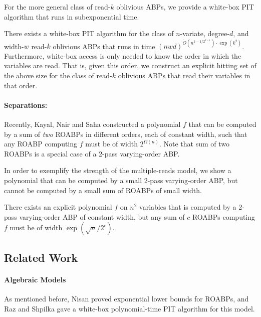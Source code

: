 \documentclass[11pt]{article}
\begin{document}
For the more general class of read-$k$ oblivious ABPs, we provide a white-box PIT algorithm that runs in subexponential time.

\begin{theorem}
\label{thm:intro:pit-k-abp}
There exists a white-box PIT algorithm for the class of $n$-variate, degree-$d$, and width-$w$ read-$k$ oblivious ABPs that runs in time $(nwd)^{\tilde{O}(n^{1-1/2^{k-1}})\cdot\exp(k^2)}$.
Furthermore, white-box access is only needed to know the order in which the variables are read. That is, given this order, we construct an explicit hitting set of the above size for the class of read-$k$ oblivious ABPs that read their variables in that order.
\end{theorem}


\paragraph{Separations:}
Recently, Kayal, Nair and Saha \cite{KNS15} constructed a polynomial $f$ that can be computed by a sum of {\em two} ROABPs in different orders, each of constant width, such that any ROABP computing $f$ must be of width $2^{\Omega(n)}$. Note that sum of two ROABPs is a special case of a $2$-pass varying-order ABP.

In order to exemplify the strength of the multiple-reads model, we show a polynomial that can be computed by a small 2-pass varying-order ABP, but cannot be computed by a small sum of ROABPs of small width.

\begin{theorem}
\label{thm:intro:separation}
There exists an explicit polynomial $f$ on $n^2$ variables that is computed by a 2-pass varying-order ABP of constant width, but any sum of $c$ ROABPs computing $f$ must be of width $\exp(\sqrt{n}/2^c)$.
\end{theorem}


\subsection{Related Work}
\label{sec:work}

\paragraph{Algebraic Models}

As mentioned before, Nisan \cite{nis91} proved exponential lower bounds for ROABPs, and Raz and Shpilka \cite{RS05} gave a white-box polynomial-time PIT algorithm for this model.
\end{document}
